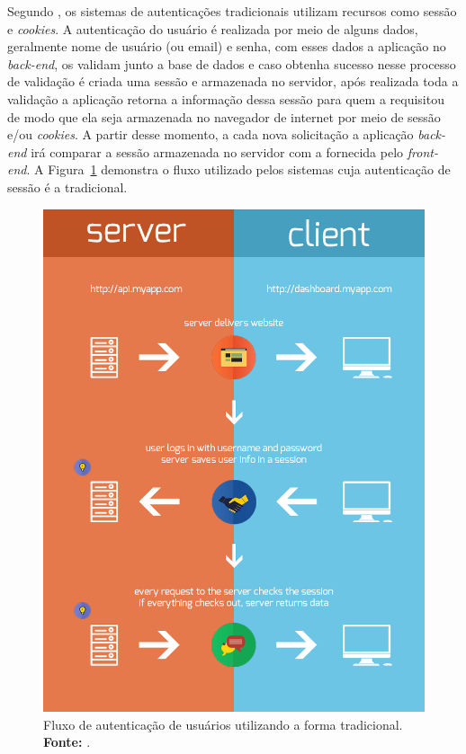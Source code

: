 Segundo , os sistemas de autenticações tradicionais utilizam recursos como sessão e \textit{cookies}. A autenticação do usuário é realizada por meio de alguns dados, geralmente nome de usuário (ou email) e senha, com esses dados a aplicação no \textit{back-end}, os validam junto a base de dados e caso obtenha sucesso nesse processo de validação é criada uma sessão e armazenada no servidor, após realizada toda a validação a aplicação retorna a informação dessa sessão para quem a requisitou de modo que ela seja armazenada no navegador de internet por meio de sessão e/ou \textit{cookies}. A partir desse momento, a cada nova solicitação a aplicação \textit{back-end} irá comparar a sessão armazenada no servidor com a fornecida pelo \textit{front-end}. A Figura~\ref{fig:autenticacao_via_sessao} demonstra o fluxo utilizado pelos sistemas cuja autenticação de sessão é a tradicional.

\newpage
\begin{figure}[h!]
	\centerline{\includegraphics[scale=0.55]{./imagens/tokens-traditional.png}}
	\caption[Fluxo de autenticação de usuários utilizando a forma tradicional]
	{Fluxo de autenticação de usuários utilizando a forma tradicional. \textbf{Fonte:} \cite{authentication_via_token_chris_sevilleja}.}
	\label{fig:autenticacao_via_sessao}
\end{figure}

